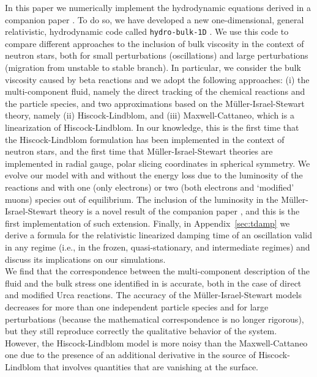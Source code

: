 \documentclass[aps,prd,twocolumn,a4paper,floatfix,nofootbib,superscriptaddress,nofootinbib]{revtex4}
\begin{document}
In this paper we numerically implement the hydrodynamic equations derived in a
companion paper \cite{Camelio22a}.  To do so, we have developed a new
one-dimensional, general relativistic, hydrodynamic code called
\texttt{hydro-bulk-1D} \citep{Camelio22code}.  We use this code to compare different approaches to
the inclusion of bulk viscosity in the context of neutron stars, both for small
perturbations (oscillations) and large perturbations (migration from unstable
to stable branch).  In particular, we consider the bulk viscosity caused by
beta reactions and we adopt the following approaches: (i) the multi-component
fluid, namely the direct tracking of the chemical reactions and the particle
species, and two approximations based on the M\"uller-Israel-Stewart theory, namely (ii)
Hiscock-Lindblom, and (iii) Maxwell-Cattaneo, which is a linearization of
Hiscock-Lindblom.  In our knowledge, this is the first time that the
Hiscock-Lindblom formulation has been implemented in the context of neutron
stars, and the first time that M\"uller-Israel-Stewart theories are implemented in
radial gauge, polar slicing coordinates in spherical symmetry.  We evolve our
model with and without the energy loss due to the luminosity of the reactions
and with one (only electrons) or two (both electrons and `modified' muons)
species out of equilibrium. The inclusion of the luminosity in the
M\"uller-Israel-Stewart theory is a novel result of the companion paper
\cite{Camelio22a}, and this is the first implementation of such extension.
Finally, in Appendix~\ref{sec:tdamp} we derive a formula for the relativistic
linearized damping time of an oscillation valid in any regime (i.e., in the
frozen, quasi-stationary, and intermediate regimes) and discuss its
implications on our simulations.\\

We find that the correspondence between the multi-component description of the
fluid and the bulk stress one identified in \citet{Gavassino21bulk} is
accurate, both in the case of direct and modified Urca reactions.
%
The accuracy of the M\"uller-Israel-Stewart models decreases for
more than one independent particle species and for large perturbations (because
the mathematical correspondence is no longer rigorous), but they still
reproduce correctly the qualitative behavior of the system.  However, the
Hiscock-Lindblom model is more noisy than the Maxwell-Cattaneo one due to the
presence of an additional derivative in the source of Hiscock-Lindblom that
involves quantities that are vanishing at the surface.
\end{document}
